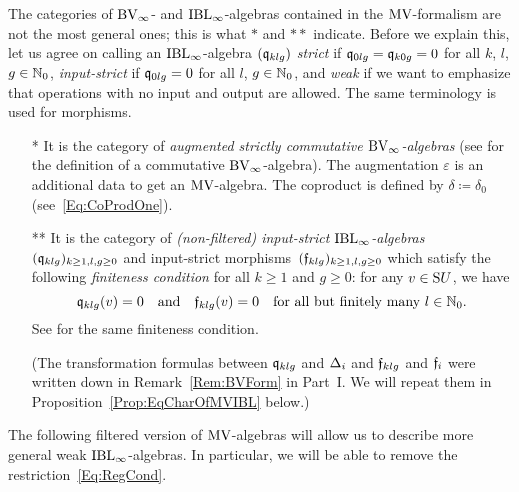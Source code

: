 \documentclass[\MainFolder/Text.tex]{subfiles}
\begin{document}
The categories of $\mathrm{BV}_\infty$- and $\mathrm{IBL}_\infty$-algebras contained in the $\mathrm{MV}$-formalism are not the most general ones; this is what $*$ and $**$ indicate. Before we explain this, let us agree on calling an $\mathrm{IBL}_\infty$-algebra $(\mathfrak{q}_{klg})$ \emph{strict} if $\mathfrak{q}_{0lg}=\mathfrak{q}_{k0g}=0$ for all $k$, $l$, $g\in \mathbb{N}_0$, \emph{input-strict} if $\mathfrak{q}_{0lg} = 0$ for all $l$, $g\in \mathbb{N}_0$, and \emph{weak} if we want to emphasize that operations with no input and output are allowed. The same terminology is used for morphisms.
\begin{itemize}
\item[*] It is the category of \emph{augmented strictly commutative $\mathrm{BV}_\infty$-algebras} (see \cite[Section~5]{Cieliebak2007} for the definition of a commutative $\mathrm{BV}_\infty$-algebra). The augmentation $\varepsilon$ is an additional data to get an $\mathrm{MV}$-algebra. The coproduct is defined by $\delta\coloneqq \delta_{0}$ (see~\eqref{Eq:CoProdOne}).
\item[**] It is the category of \emph{(non-filtered) input-strict $\mathrm{IBL}_\infty$-algebras} $(\mathfrak{q}_{klg})_{k \ge 1, l, g\ge 0}$ and input-strict morphisms~$(\mathfrak{f}_{klg})_{k\ge 1,l, g\ge 0}$ which satisfy the following \emph{finiteness condition} for all $k\ge 1$ and $g\ge 0$: for any $v\in \mathrm{S} U$, we have
\begin{equation}\label{Eq:RegCond}
\mathfrak{q}_{klg}(v) = 0\quad\text{and}\quad\mathfrak{f}_{klg}(v) = 0 \quad\text{for all but finitely many }l\in \mathbb{N}_0.
\end{equation}
See \cite[Remark~(6), p.\,14]{Cieliebak2015} for the same finiteness condition.

(The transformation formulas between $\mathfrak{q}_{klg}$ and $\operatorname{\Delta}_i$ and $\mathfrak{f}_{klg}$ and $\mathfrak{f}_i$ were written down in Remark~\ref{Rem:BVForm} in Part~I. We will repeat them in Proposition~\ref{Prop:EqCharOfMVIBL} below.)
\end{itemize}


The following filtered version of $\mathrm{MV}$-algebras will allow us to describe more general weak $\mathrm{IBL}_\infty$-algebras. In particular, we will be able to remove the restriction~\eqref{Eq:RegCond}.
\end{document}
